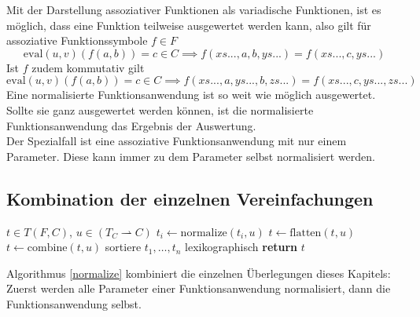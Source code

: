 \documentclass{scrartcl}
\numberwithin{figure}{section} %
\theoremstyle{definition} %
\begin{document}
Mit der Darstellung assoziativer Funktionen als variadische Funktionen, ist es möglich, dass eine Funktion teilweise ausgewertet werden kann, also gilt für assoziative Funktionssymbole $f \in F$
$$\mathrm{eval}(u, v)(f(a, b)) = c \in C \implies f(xs..., a, b, ys...) = f(xs..., c, ys...)$$
Ist $f$ zudem kommutativ gilt 
$$\mathrm{eval}(u, v)(f(a, b)) = c \in C \implies f(xs..., a, ys..., b, zs...) = f(xs..., c, ys..., zs...)$$
Eine normalisierte Funktionsanwendung ist so weit wie möglich ausgewertet. Sollte sie ganz ausgewertet werden können, ist die normalisierte Funktionsanwendung das Ergebnis der Auswertung. \\
Der Spezialfall ist eine assoziative Funktionsanwendung mit nur einem Parameter. Diese kann immer zu dem Parameter selbst normalisiert werden. 

\subsection{Kombination der einzelnen Vereinfachungen}

\begin{algorithm}
\caption{$\mathrm{normalize} \colon T \times (T_C \rightharpoonup C) \rightarrow T$}\label{normalize}
\begin{algorithmic}[1] %
\Require $t \in T(F, C)$, $u \in (T_C \rightharpoonup C)$
		\State $t_i \leftarrow \mathrm{normalize}(t_i, u)$
	\EndFor
\EndIf
\State $t \leftarrow \mathrm{flatten}(t, u)$
\State $t \leftarrow \mathrm{combine}(t, u)$
	\State sortiere $t_1, \dots, t_n$ lexikographisch
\EndIf
\State \textbf{return} $t$ 
\end{algorithmic}
\end{algorithm}
Algorithmus \ref{normalize} kombiniert die einzelnen Überlegungen dieses Kapitels: Zuerst werden alle Parameter einer Funktionsanwendung normalisiert, dann die Funktionsanwendung selbst.
\end{document}
